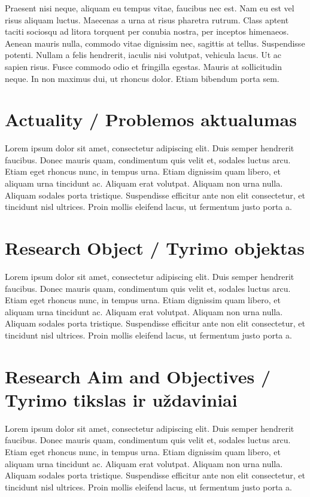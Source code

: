 Praesent nisi neque, aliquam eu tempus vitae, faucibus nec est. Nam eu est vel risus aliquam luctus. Maecenas a urna at risus pharetra rutrum. Class aptent taciti sociosqu ad litora torquent per conubia nostra, per inceptos himenaeos. Aenean mauris nulla, commodo vitae dignissim nec, sagittis at tellus. Suspendisse potenti. Nullam a felis hendrerit, iaculis nisi volutpat, vehicula lacus. Ut ac sapien risus. Fusce commodo odio et fringilla egestas. Mauris at sollicitudin neque. In non maximus dui, ut rhoncus dolor. Etiam bibendum porta sem.


\section*{Actuality / Problemos aktualumas}

Lorem ipsum dolor sit amet, consectetur adipiscing elit. Duis semper hendrerit faucibus. Donec mauris quam, condimentum quis velit et, sodales luctus arcu. Etiam eget rhoncus nunc, in tempus urna. Etiam dignissim quam libero, et aliquam urna tincidunt ac. Aliquam erat volutpat. Aliquam non urna nulla. Aliquam sodales porta tristique. Suspendisse efficitur ante non elit consectetur, et tincidunt nisl ultrices. Proin mollis eleifend lacus, ut fermentum justo porta a.


\section*{Research Object / Tyrimo objektas}

Lorem ipsum dolor sit amet, consectetur adipiscing elit. Duis semper hendrerit faucibus. Donec mauris quam, condimentum quis velit et, sodales luctus arcu. Etiam eget rhoncus nunc, in tempus urna. Etiam dignissim quam libero, et aliquam urna tincidunt ac. Aliquam erat volutpat. Aliquam non urna nulla. Aliquam sodales porta tristique. Suspendisse efficitur ante non elit consectetur, et tincidunt nisl ultrices. Proin mollis eleifend lacus, ut fermentum justo porta a.


\section*{Research Aim and Objectives / Tyrimo tikslas ir uždaviniai}

Lorem ipsum dolor sit amet, consectetur adipiscing elit. Duis semper hendrerit faucibus. Donec mauris quam, condimentum quis velit et, sodales luctus arcu. Etiam eget rhoncus nunc, in tempus urna. Etiam dignissim quam libero, et aliquam urna tincidunt ac. Aliquam erat volutpat. Aliquam non urna nulla. Aliquam sodales porta tristique. Suspendisse efficitur ante non elit consectetur, et tincidunt nisl ultrices. Proin mollis eleifend lacus, ut fermentum justo porta a.


